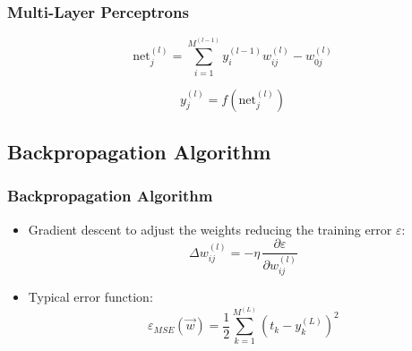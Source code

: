 \begin{frame}
  \frametitle{Multi-Layer Perceptrons \cont}


  \begin{center}
    \resizebox{.8\linewidth}{!}{
      
    }
  \end{center}

  \begin{displaymath}
    \text{net}_j^{(l)} = \sum_{i=1}^{M^{(l-1)}} y_i^{(l-1)} w_{ij}^{(l)} - w_{0j}^{(l)}
  \end{displaymath}

  \begin{displaymath}
    y_j^{(l)} = f(\text{net}_j^{(l)})
  \end{displaymath}
\end{frame}


\subsection{Backpropagation Algorithm}

\begin{frame}
  \frametitle{Backpropagation Algorithm}


  \begin{itemize}
    \item Gradient descent to adjust the weights reducing the training error $\varepsilon$:
      \begin{displaymath}
        \Delta w_{ij}^{(l)} = - \eta \, \frac{\partial \varepsilon}{\partial w_{ij}^{(l)}}
      \end{displaymath}

    \item Typical error function: 
      \begin{displaymath}
        \varepsilon_{MSE}(\vec{w}) = \frac{1}{2} \sum_{k=1}^{M^{(L)}} (t_k - y_k^{(L)})^2
      \end{displaymath}
  \end{itemize}
\end{frame}


\newcommand{\err}{\varepsilon_{\text{MSE}}}
\newcommand{\net}[2]{\text{net}_{#1}^{(#2)}}
\newcommand{\w}[2]{w_{#1}^{(#2)}}
\newcommand{\y}[2]{y_{#1}^{(#2)}}

